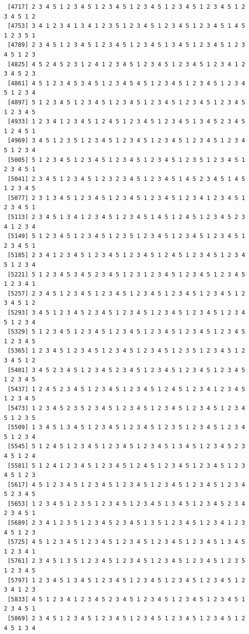\documentclass[
  english,
]{book}
\begin{document}
\begin{verbatim}
 [4717] 2 3 4 5 1 2 3 4 5 1 2 3 4 5 1 2 3 4 5 1 2 3 4 5 1 2 3 4 5 1 2 3 4 5 1 2
 [4753] 3 4 1 2 3 4 1 3 4 1 2 3 5 1 2 3 4 5 1 2 3 4 5 1 2 3 4 5 1 4 5 1 2 3 5 1
 [4789] 2 3 4 5 1 2 3 4 5 1 2 3 4 5 1 2 3 4 5 1 3 4 5 1 2 3 4 5 1 2 3 4 5 1 2 3
 [4825] 4 5 2 4 5 2 3 1 2 4 1 2 3 4 5 1 2 3 4 5 1 2 3 4 5 1 2 3 4 1 2 3 4 5 2 3
 [4861] 4 5 1 2 3 4 5 3 4 5 1 2 3 4 5 4 5 1 2 3 4 5 1 2 3 4 5 1 2 3 4 5 1 2 3 4
 [4897] 5 1 2 3 4 5 1 2 3 4 5 1 2 3 4 5 1 2 3 4 5 1 2 3 4 5 1 2 3 4 5 1 2 3 4 5
 [4933] 1 2 3 4 1 2 3 4 5 1 2 4 5 1 2 3 4 5 1 2 3 4 5 1 3 4 5 2 3 4 5 1 2 4 5 1
 [4969] 3 4 5 1 2 3 5 1 2 3 4 5 1 2 3 4 5 1 2 3 4 5 1 2 3 4 5 1 2 3 4 5 1 2 3 4
 [5005] 5 1 2 3 4 5 1 2 3 4 5 1 2 3 4 5 1 2 3 4 5 1 2 3 5 1 2 3 4 5 1 2 3 4 5 1
 [5041] 2 3 4 5 1 2 3 4 5 1 2 3 2 3 4 5 1 2 3 4 5 1 4 5 2 3 4 5 1 4 5 1 2 3 4 5
 [5077] 2 3 1 3 4 5 1 2 3 4 5 1 2 3 4 5 1 2 3 4 5 1 2 3 4 1 2 3 4 5 1 2 3 4 5 1
 [5113] 2 3 4 5 1 3 4 1 2 3 4 5 1 2 3 4 5 1 4 5 1 2 4 5 1 2 3 4 5 2 3 4 1 2 3 4
 [5149] 5 1 2 3 4 5 1 2 3 4 5 1 2 3 5 1 2 3 4 5 1 2 3 4 5 1 2 3 4 5 1 2 3 4 5 1
 [5185] 2 3 4 1 2 3 4 5 1 2 3 4 5 1 2 3 4 5 1 2 4 5 1 2 3 4 5 1 2 3 4 5 1 2 3 4
 [5221] 5 1 2 3 4 5 3 4 5 2 3 4 5 1 2 3 1 2 3 4 5 1 2 3 4 5 1 2 3 4 5 1 2 3 4 1
 [5257] 2 3 4 5 1 2 3 4 5 1 2 3 4 5 1 2 3 4 5 1 2 3 4 5 1 2 3 4 5 1 2 3 4 5 1 2
 [5293] 3 4 5 1 2 3 4 5 2 3 4 5 1 2 3 4 5 1 2 3 4 5 1 2 3 4 5 1 2 3 4 5 1 2 3 4
 [5329] 5 1 2 3 4 5 1 2 3 4 5 1 2 3 4 5 1 2 3 4 5 1 2 3 4 5 1 2 3 4 5 1 2 3 4 5
 [5365] 1 2 3 4 5 1 2 3 4 5 1 2 3 4 5 1 2 3 4 5 1 2 3 5 1 2 3 4 5 1 2 3 4 5 1 2
 [5401] 3 4 5 2 3 4 5 1 2 3 4 5 2 3 4 5 1 2 3 4 5 1 2 3 4 5 1 2 3 4 5 1 2 3 4 5
 [5437] 1 2 4 5 2 3 4 5 1 2 3 4 5 1 2 3 4 5 1 2 4 5 1 2 3 4 1 2 3 4 5 1 2 3 4 5
 [5473] 1 2 3 4 5 2 3 5 2 3 4 5 1 2 3 4 5 1 2 3 4 5 1 2 3 4 5 1 2 3 4 5 1 2 3 5
 [5509] 1 3 4 5 1 3 4 5 1 2 3 4 5 1 2 3 4 5 1 2 3 5 1 2 3 4 5 1 2 3 4 5 1 2 3 4
 [5545] 5 1 2 4 5 1 2 3 4 5 1 2 3 4 5 1 2 3 4 5 1 3 4 5 1 2 3 4 5 2 3 4 5 1 2 4
 [5581] 5 1 2 4 1 2 3 4 5 1 2 3 4 5 1 2 4 5 1 2 3 4 5 1 2 3 4 5 1 2 3 4 5 1 2 3
 [5617] 4 5 1 2 3 4 5 1 2 3 4 5 1 2 3 4 5 1 2 3 4 5 1 2 3 4 5 1 2 3 4 5 2 3 4 5
 [5653] 1 2 3 4 5 1 2 3 5 1 2 3 4 5 1 2 3 4 5 1 3 4 5 1 2 3 4 5 2 3 4 2 3 4 5 1
 [5689] 2 3 4 1 2 3 5 1 2 3 4 5 2 3 4 5 1 3 5 1 2 3 4 5 1 2 3 4 1 2 3 4 5 1 2 3
 [5725] 4 5 1 2 3 4 5 1 2 3 4 5 1 2 3 4 5 1 2 3 4 5 1 2 3 4 5 1 3 4 5 1 2 3 4 1
 [5761] 2 3 4 5 1 3 5 1 2 3 4 5 1 2 3 4 5 1 2 3 4 5 1 2 3 4 5 1 2 3 5 1 2 3 4 5
 [5797] 1 2 3 4 5 1 3 4 5 1 2 3 4 5 1 2 3 4 5 1 2 3 4 5 1 2 3 4 5 1 2 3 4 1 2 3
 [5833] 4 5 1 2 3 4 1 2 3 4 5 2 3 4 5 1 2 3 4 5 1 2 3 4 5 1 2 3 4 5 1 2 3 4 5 1
 [5869] 2 3 4 5 1 2 3 4 5 1 2 3 4 5 1 2 3 4 5 1 2 3 4 5 1 2 3 4 5 1 2 4 5 1 3 4

\end{verbatim}
\end{document}

